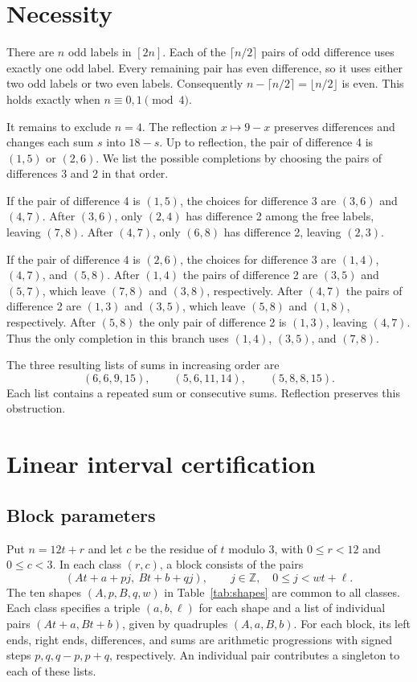 \documentclass[11pt]{amsart}
\begin{document}
\section{Necessity}

There are \(n\) odd labels in \([2n]\). Each of the
\(\lceil n/2\rceil\) pairs of odd difference uses exactly one odd
label. Every remaining pair has even difference, so it uses either
two odd labels or two even labels. Consequently
\(n-\lceil n/2\rceil=\lfloor n/2\rfloor\) is even. This holds
exactly when \(n\equiv0,1\pmod4\).

It remains to exclude \(n=4\). The reflection \(x\mapsto9-x\)
preserves differences and changes each sum \(s\) into \(18-s\).
Up to reflection, the pair of difference 4 is \((1,5)\) or
\((2,6)\). We list the possible completions by choosing the
pairs of differences 3 and 2 in that order.

If the pair of difference 4 is \((1,5)\), the choices for
difference 3 are \((3,6)\) and \((4,7)\). After \((3,6)\),
only \((2,4)\) has difference 2 among the free labels, leaving
\((7,8)\). After \((4,7)\), only \((6,8)\) has difference 2,
leaving \((2,3)\).

If the pair of difference 4 is \((2,6)\), the choices for
difference 3 are \((1,4)\), \((4,7)\), and \((5,8)\). After \((1,4)\) the
pairs of difference 2 are \((3,5)\) and \((5,7)\), which leave
\((7,8)\) and \((3,8)\), respectively. After \((4,7)\) the
pairs of difference 2 are \((1,3)\) and \((3,5)\), which leave
\((5,8)\) and \((1,8)\), respectively. After \((5,8)\) the
only pair of difference 2 is \((1,3)\), leaving \((4,7)\).
Thus the only completion in this branch uses \((1,4)\), \((3,5)\),
and \((7,8)\).

The three resulting lists of sums in increasing order are
\[
  (6,6,9,15),\qquad (5,6,11,14),\qquad (5,8,8,15).
\]
Each list contains a repeated sum or consecutive sums. Reflection
preserves this obstruction.

\section{Linear interval certification}

\subsection{Block parameters}

Put \(n=12t+r\) and let \(c\) be the residue of \(t\) modulo 3,
with \(0\le r<12\) and \(0\le c<3\). In each class \((r,c)\),
a block consists of the pairs
\begin{equation}\label{eq:block}
  (At+a+pj,\ Bt+b+qj),\qquad j\in\mathbb Z,\quad 0\le j<wt+\ell.
\end{equation}
The ten shapes \((A,p,B,q,w)\) in Table~\ref{tab:shapes} are
common to all classes. Each class specifies a triple
\((a,b,\ell)\) for each shape and a list of individual pairs
\((At+a,Bt+b)\), given by quadruples \((A,a,B,b)\).
For each block, its left ends, right ends, differences, and sums
are arithmetic progressions with signed steps \(p,q,q-p,p+q\),
respectively. An individual pair contributes a singleton to each
of these lists.
\end{document}
